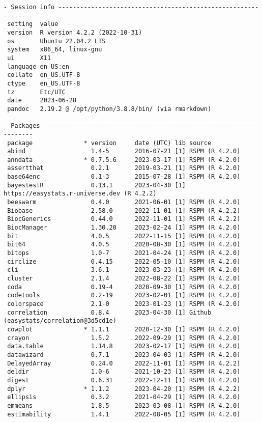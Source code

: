 \documentclass[
  letterpaper,
  DIV=11,
  numbers=noendperiod]{scrartcl}
\begin{document}
\begin{verbatim}
- Session info ---------------------------------------------------------------
 setting  value
 version  R version 4.2.2 (2022-10-31)
 os       Ubuntu 22.04.2 LTS
 system   x86_64, linux-gnu
 ui       X11
 language en_US:en
 collate  en_US.UTF-8
 ctype    en_US.UTF-8
 tz       Etc/UTC
 date     2023-06-28
 pandoc   2.19.2 @ /opt/python/3.8.8/bin/ (via rmarkdown)

- Packages -------------------------------------------------------------------
 package              * version     date (UTC) lib source
 abind                  1.4-5       2016-07-21 [1] RSPM (R 4.2.0)
 anndata              * 0.7.5.6     2023-03-17 [1] RSPM (R 4.2.0)
 assertthat             0.2.1       2019-03-21 [1] RSPM (R 4.2.0)
 base64enc              0.1-3       2015-07-28 [1] RSPM (R 4.2.0)
 bayestestR             0.13.1      2023-04-30 [1] https://easystats.r-universe.dev (R 4.2.2)
 beeswarm               0.4.0       2021-06-01 [1] RSPM (R 4.2.0)
 Biobase                2.58.0      2022-11-01 [1] RSPM (R 4.2.2)
 BiocGenerics           0.44.0      2022-11-01 [1] RSPM (R 4.2.2)
 BiocManager            1.30.20     2023-02-24 [1] RSPM (R 4.2.0)
 bit                    4.0.5       2022-11-15 [1] RSPM (R 4.2.0)
 bit64                  4.0.5       2020-08-30 [1] RSPM (R 4.2.0)
 bitops                 1.0-7       2021-04-24 [1] RSPM (R 4.2.0)
 circlize               0.4.15      2022-05-10 [1] RSPM (R 4.2.0)
 cli                    3.6.1       2023-03-23 [1] RSPM (R 4.2.0)
 cluster                2.1.4       2022-08-22 [1] RSPM (R 4.2.0)
 coda                   0.19-4      2020-09-30 [1] RSPM (R 4.2.0)
 codetools              0.2-19      2023-02-01 [1] RSPM (R 4.2.0)
 colorspace             2.1-0       2023-01-23 [1] RSPM (R 4.2.0)
 correlation            0.8.4       2023-04-30 [1] Github (easystats/correlation@3d5cd1e)
 cowplot              * 1.1.1       2020-12-30 [1] RSPM (R 4.2.0)
 crayon                 1.5.2       2022-09-29 [1] RSPM (R 4.2.0)
 data.table             1.14.8      2023-02-17 [1] RSPM (R 4.2.0)
 datawizard             0.7.1       2023-04-03 [1] RSPM (R 4.2.0)
 DelayedArray           0.24.0      2022-11-01 [1] RSPM (R 4.2.2)
 deldir                 1.0-6       2021-10-23 [1] RSPM (R 4.2.0)
 digest                 0.6.31      2022-12-11 [1] RSPM (R 4.2.0)
 dplyr                * 1.1.2       2023-04-20 [1] RSPM (R 4.2.2)
 ellipsis               0.3.2       2021-04-29 [1] RSPM (R 4.2.0)
 emmeans                1.8.5       2023-03-08 [1] RSPM (R 4.2.0)
 estimability           1.4.1       2022-08-05 [1] RSPM (R 4.2.0)

\end{verbatim}
\end{document}
